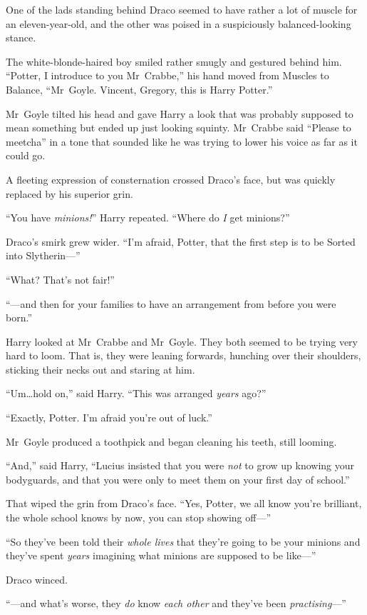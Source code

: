 One of the lads standing behind Draco seemed to have rather a lot of muscle for an eleven-year-old, and the other was poised in a suspiciously balanced-looking stance.

The white-blonde-haired boy smiled rather smugly and gestured behind him. “Potter, I introduce to you Mr~Crabbe,” his hand moved from Muscles to Balance, “Mr~Goyle. Vincent, Gregory, this is Harry Potter.”

Mr~Goyle tilted his head and gave Harry a look that was probably supposed to mean something but ended up just looking squinty. Mr~Crabbe said “Please to meetcha” in a tone that sounded like he was trying to lower his voice as far as it could go.

A fleeting expression of consternation crossed Draco’s face, but was quickly replaced by his superior grin.

“You have \emph{minions!}” Harry repeated. “Where do \emph{I} get minions?”

Draco’s smirk grew wider. “I’m afraid, Potter, that the first step is to be Sorted into Slytherin—”

“What? That’s not fair!”

“—and then for your families to have an arrangement from before you were born.”

Harry looked at Mr~Crabbe and Mr~Goyle. They both seemed to be trying very hard to loom. That is, they were leaning forwards, hunching over their shoulders, sticking their necks out and staring at him.

“Um…hold on,” said Harry. “This was arranged \emph{years} ago?”

“Exactly, Potter. I’m afraid you’re out of luck.”

Mr~Goyle produced a toothpick and began cleaning his teeth, still looming.

“And,” said Harry, “Lucius insisted that you were \emph{not} to grow up knowing your bodyguards, and that you were only to meet them on your first day of school.”

That wiped the grin from Draco’s face. “Yes, Potter, we all know you’re brilliant, the whole school knows by now, you can stop showing off—”

“So they’ve been told their \emph{whole lives} that they’re going to be your minions and they’ve spent \emph{years} imagining what minions are supposed to be like—”

Draco winced.

“—and what’s worse, they \emph{do} know \emph{each other} and they’ve been \emph{practising}—”


